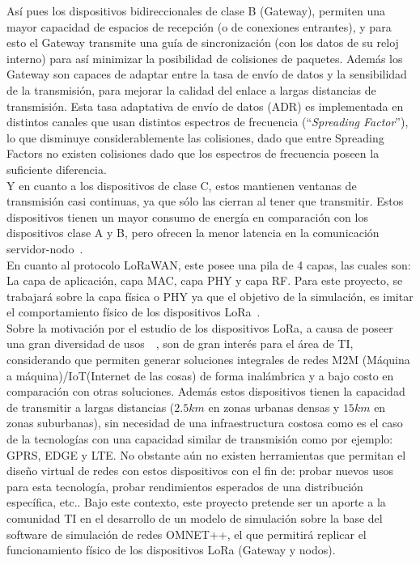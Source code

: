 \begin{justify}
Así pues los dispositivos bidireccionales de clase B (Gateway), permiten una mayor capacidad de espacios de recepción (o de conexiones entrantes), y para esto el Gateway transmite una guía de sincronización (con los datos de su reloj interno) para así minimizar la posibilidad de colisiones de paquetes. Además los Gateway son capaces de adaptar entre la tasa de envío de datos y la sensibilidad de la transmisión, para mejorar la calidad del enlace a largas distancias de transmisión. Esta tasa adaptativa de envío de datos (ADR) es implementada en distintos canales que usan distintos espectros de frecuencia (``\textit{Spreading Factor}''), lo que disminuye considerablemente las colisiones, dado que entre Spreading Factors no existen colisiones dado que los espectros de frecuencia poseen la suficiente diferencia.\\
Y en cuanto a los dispositivos de clase C, estos mantienen ventanas de transmisión casi continuas, ya que sólo las cierran al tener que transmitir. Estos dispositivos tienen un mayor consumo de energía en comparación con los dispositivos clase A y B, pero ofrecen la menor latencia en la comunicación servidor-nodo~\cite{Sornin}.\\
En cuanto al protocolo LoRaWAN, este posee una pila de 4 capas, las cuales son: La capa de aplicación, capa MAC, capa PHY y capa RF. Para este proyecto, se trabajará sobre la capa física o PHY ya que el objetivo de la simulación, es imitar el comportamiento físico de los dispositivos LoRa~\cite{Sornin2}.\\
Sobre la motivación por el estudio de los dispositivos LoRa, a causa de poseer una gran diversidad de usos~\cite{use1}~\cite{use2}, son de gran interés para el área de TI, considerando que permiten generar soluciones integrales de redes M2M (Máquina a máquina)/IoT(Internet de las cosas) de forma inalámbrica y a bajo costo en comparación con otras soluciones. Además estos dispositivos tienen la capacidad de transmitir a largas distancias ($2.5 km$ en zonas urbanas densas y $15 km$ en zonas suburbanas), sin necesidad de una infraestructura costosa como es el caso de la tecnologías con una capacidad similar de transmisión como por ejemplo: GPRS, EDGE y LTE. No obstante aún no existen herramientas que permitan el diseño virtual de redes con estos dispositivos con el fin de: probar nuevos usos para esta tecnología, probar rendimientos esperados de una distribución específica, etc.. Bajo este contexto, este proyecto pretende ser un aporte a la comunidad TI en el desarrollo de un modelo de simulación sobre la base del software de simulación de redes OMNET++, el que permitirá replicar el funcionamiento físico de los dispositivos LoRa (Gateway y nodos).

\end{justify}
